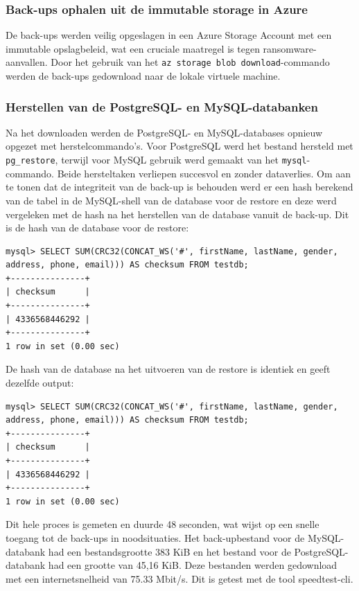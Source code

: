 \subsubsection{Back-ups ophalen uit de immutable storage in Azure}
De back-ups werden veilig opgeslagen in een Azure Storage Account met een immutable opslagbeleid, wat een cruciale maatregel is tegen ransomware-aanvallen. Door het gebruik van het \texttt{az storage blob download}-commando werden de back-ups gedownload naar de lokale virtuele machine.

\subsubsection{Herstellen van de PostgreSQL- en MySQL-databanken}
Na het downloaden werden de PostgreSQL- en MySQL-databases opnieuw opgezet met herstelcommando’s. Voor PostgreSQL werd het bestand hersteld met \texttt{pg\_restore}, terwijl voor MySQL gebruik werd gemaakt van het \texttt{mysql}-commando. Beide hersteltaken verliepen succesvol en zonder dataverlies. Om aan te tonen dat de integriteit van de back-up is behouden werd er een hash berekend van de tabel in de MySQL-shell van de database voor de restore en deze werd vergeleken met de hash na het herstellen van de database vanuit de back-up. Dit is de hash van de database voor de restore:
\begin{lstlisting}[language=code, caption={MySQL commando om de hash van de tabel te berekenen voor de restore.}]
mysql> SELECT SUM(CRC32(CONCAT_WS('#', firstName, lastName, gender, address, phone, email))) AS checksum FROM testdb;
+---------------+
| checksum      |
+---------------+
| 4336568446292 |
+---------------+
1 row in set (0.00 sec)
\end{lstlisting}  
De hash van de database na het uitvoeren van de restore is identiek en geeft dezelfde output:
\begin{lstlisting}[language=code, caption={MySQL commando om de hash van de tabel te berekenen voor de restore.}]
mysql> SELECT SUM(CRC32(CONCAT_WS('#', firstName, lastName, gender, address, phone, email))) AS checksum FROM testdb;
+---------------+
| checksum      |
+---------------+
| 4336568446292 |
+---------------+
1 row in set (0.00 sec)
\end{lstlisting}  

Dit hele proces is gemeten en duurde 48 seconden, wat wijst op een snelle toegang tot de back-ups in noodsituaties. Het back-upbestand voor de MySQL-databank had een bestandsgrootte 383 KiB en het bestand voor de PostgreSQL-databank had een grootte van 45,16 KiB. Deze bestanden werden gedownload met een internetsnelheid van 75.33 Mbit/s. Dit is getest met de tool speedtest-cli.


